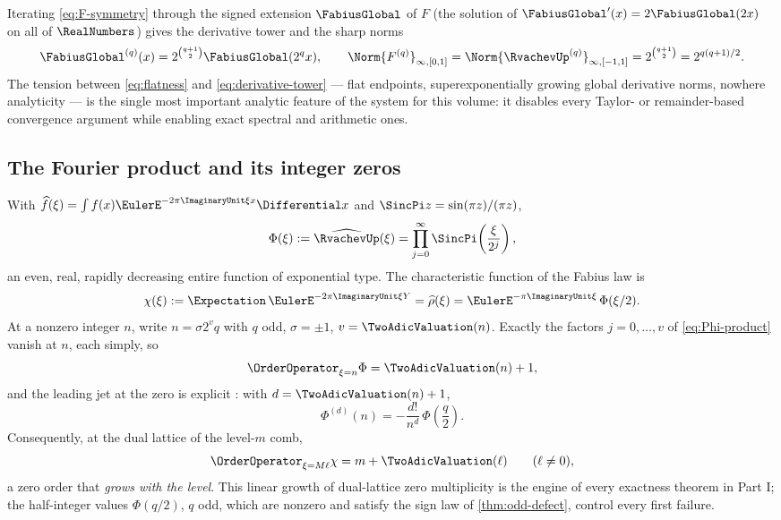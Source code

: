 \documentclass[11pt,oneside]{article}
\numberwithin{equation}{section}
\theoremstyle{definition}
\theoremstyle{remark}
\begin{document}
Iterating \eqref{eq:F-symmetry} through the signed extension
$\FabiusGlobal$ of $F$ (the solution of $\FabiusGlobal'(x)=2\FabiusGlobal(2x)$ on
all of $\RealNumbers$) gives the derivative tower and the sharp norms
\begin{equation}
 \FabiusGlobal^{(q)}(x)=2^{\binom{q+1}{2}}\FabiusGlobal(2^qx),
 \qquad
 \Norm{F^{(q)}}_{\infty,[0,1]}
 =\Norm{\RvachevUp^{(q)}}_{\infty,[-1,1]}
 =2^{\binom{q+1}{2}}=2^{q(q+1)/2}.
 \label{eq:derivative-tower}
\end{equation}
The tension between \eqref{eq:flatness} and
\eqref{eq:derivative-tower} --- flat endpoints, superexponentially
growing global derivative norms, nowhere analyticity --- is the single
most important analytic feature of the system for this volume: it
disables every Taylor- or remainder-based convergence argument while
enabling exact spectral and arithmetic ones.

\subsection{The Fourier product and its integer zeros}
\label{sec:fourier}

With $\widehat f(\xi)=\int f(x)\EulerE^{-2\pi\ImaginaryUnit\xi x}\Differential x$ and
$\SincPi z=\sin(\pi z)/(\pi z)$,
\begin{equation}
 \Phi(\xi):=\widehat{\RvachevUp}(\xi)
 =\prod_{j=0}^{\infty}\SincPi\!\left(\frac{\xi}{2^j}\right),
 \label{eq:Phi-product}
\end{equation}
an even, real, rapidly decreasing entire function of exponential type.
The characteristic function of the Fabius law is
\begin{equation}
 \chi(\xi):=\Expectation\,\EulerE^{-2\pi\ImaginaryUnit\xi Y}
 =\widehat\rho(\xi)
 =\EulerE^{-\pi\ImaginaryUnit\xi}\,\Phi(\xi/2).
 \label{eq:chi-Phi}
\end{equation}
At a nonzero integer $n$, write $n=\sigma2^{v}q$ with $q$ odd,
$\sigma=\pm1$, $v=\TwoAdicValuation(n)$.  Exactly the factors
$j=0,\dots,v$ of \eqref{eq:Phi-product} vanish at $n$, each simply, so
\begin{equation}
 \OrderOperator_{\xi=n}\Phi=\TwoAdicValuation(n)+1,
 \label{eq:Phi-zero-order}
\end{equation}
and the leading jet at the zero is explicit \cite{ProveItPrimary}:
with $d=\TwoAdicValuation(n)+1$,
\begin{equation}
 \Phi^{(d)}(n)
 =-\frac{d!}{n^{d}}\,\Phi\!\left(\frac q2\right).
 \label{eq:integer-leading-jet}
\end{equation}
Consequently, at the dual lattice of the level-$m$ comb,
\begin{equation}
 \OrderOperator_{\xi=M\ell}\chi=m+\TwoAdicValuation(\ell)
 \qquad(\ell\ne0),
 \label{eq:chi-zero-order}
\end{equation}
a zero order that \emph{grows with the level}.  This linear growth of
dual-lattice zero multiplicity is the engine of every exactness theorem
in Part I; the half-integer values $\Phi(q/2)$, $q$ odd, which are
nonzero and satisfy the sign law of \cref{thm:odd-defect}, control every
first failure.
\end{document}
